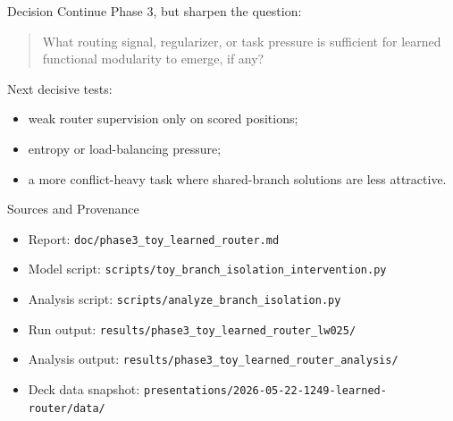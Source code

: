 \documentclass[aspectratio=169]{beamer}
\begin{document}
\begin{frame}{Decision}
  Continue Phase 3, but sharpen the question:

  \begin{quote}
    What routing signal, regularizer, or task pressure is sufficient for learned
    functional modularity to emerge, if any?
  \end{quote}

  \vspace{0.8em}
  Next decisive tests:
  \begin{itemize}
    \item weak router supervision only on scored positions;
    \item entropy or load-balancing pressure;
    \item a more conflict-heavy task where shared-branch solutions are less attractive.
  \end{itemize}
\end{frame}

\begin{frame}{Sources and Provenance}
  \scriptsize
  \begin{itemize}
    \item Report: \texttt{doc/phase3\_toy\_learned\_router.md}
    \item Model script: \texttt{scripts/toy\_branch\_isolation\_intervention.py}
    \item Analysis script: \texttt{scripts/analyze\_branch\_isolation.py}
    \item Run output: \texttt{results/phase3\_toy\_learned\_router\_lw025/}
    \item Analysis output: \texttt{results/phase3\_toy\_learned\_router\_analysis/}
    \item Deck data snapshot: \texttt{presentations/2026-05-22-1249-learned-router/data/}
  \end{itemize}
\end{frame}
\end{document}
